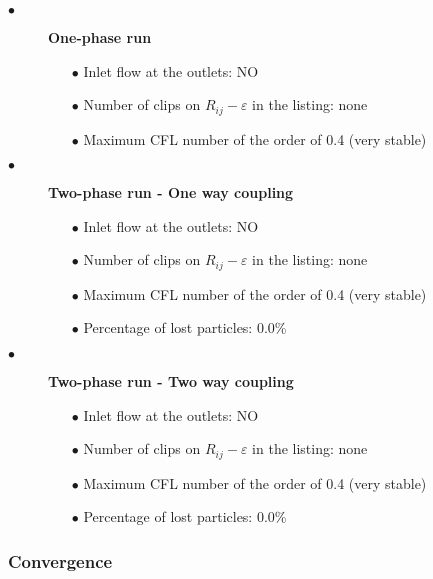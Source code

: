 \begin{description}

   \item[$\bullet$]\textbf{One-phase run}

         \begin{itemize}
            \item[$\bullet$] Inlet flow at the outlets: NO
            \item[$\bullet$] Number of clips on $R_{ij}-\varepsilon$ in the listing: none
            \item[$\bullet$] Maximum CFL number of the order of 0.4 (very stable)
         \end{itemize}

   \item[$\bullet$]\textbf{Two-phase run - One way coupling}

         \begin{itemize}
            \item[$\bullet$] Inlet flow at the outlets: NO
            \item[$\bullet$] Number of clips on $R_{ij}-\varepsilon$ in the listing: none
            \item[$\bullet$] Maximum CFL number of the order of 0.4 (very stable)
            \item[$\bullet$] Percentage of lost particles: $0.0$\%
         \end{itemize}
         
   \item[$\bullet$]\textbf{Two-phase run - Two way coupling}

         \begin{itemize}
            \item[$\bullet$] Inlet flow at the outlets: NO
            \item[$\bullet$] Number of clips on $R_{ij}-\varepsilon$ in the listing: none
            \item[$\bullet$] Maximum CFL number of the order of 0.4 (very stable)
            \item[$\bullet$] Percentage of lost particles: $0.0$\%
         \end{itemize}

\end{description}

\subsubsection{Convergence}

